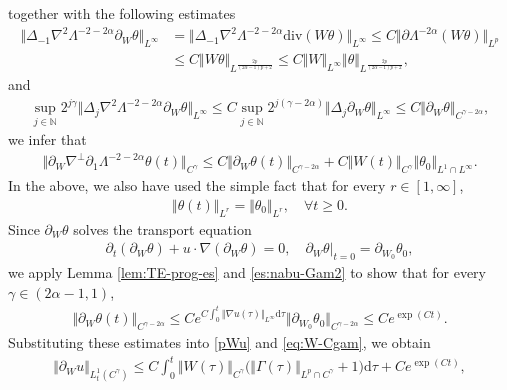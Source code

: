 \documentclass[reqno,11pt,a4paper]{amsart}
\newcommand{\NN}{\ensuremath{\mathbb{N}}}
\newcommand{\dd}{\mathrm{d}}
\def \p {\partial}
\begin{document}
together with the following estimates
\begin{align*}
  \Vert \Delta_{-1} \nabla^2 \Lambda^{-2-2\alpha} \p_W\theta\Vert _{L^\infty}
  & =\Vert \Delta_{-1} \nabla^2 \Lambda^{-2-2\alpha} \mathrm{div}(W\theta)\Vert _{L^\infty}
  \leq C\Vert \p \Lambda^{-2\alpha} (W\theta)\Vert _{L^p}\\
  &\leq C\Vert W\theta\Vert _{L^\frac{2p}{(2\alpha-1)p+2}}\leq C\Vert W\Vert _{L^\infty}\Vert \theta\Vert _{L^\frac{2p}{(2\alpha-1)p+2}},
\end{align*}
and
\begin{align*}
  \sup\limits_{j\in\NN}2^{j\gamma}\Vert \Delta_j \nabla^2 
  \Lambda^{-2-2\alpha} \p_W\theta\Vert _{L^\infty}
  \leq C \sup\limits_{j\in\NN} 2^{j(\gamma-2\alpha)}\Vert \Delta_j \p_W\theta\Vert _{L^\infty}
  \leq C \Vert  \p_W\theta\Vert _{C^{\gamma-2\alpha}},
\end{align*}
we infer that 
\begin{align*}
  \big\Vert \partial_W \nabla^{\perp}\p_1\Lambda^{-2-2\alpha} \theta(t) \big\Vert _{C^\gamma}  
  \leq  C \Vert  \p_W\theta(t)\Vert _{C^{\gamma-2\alpha}} 
  + C \Vert  W(t)\Vert _{C^\gamma} \Vert \theta_0\Vert _{L^1\cap L^\infty}.
\end{align*}
In the above, we also have used the simple fact that for every $r\in[1,\infty]$,\,
\begin{align}\label{eq:the-MP} 
  \Vert \theta(t)\Vert _{L^r}=\Vert \theta_0\Vert _{L^r},\quad \forall t\geq 0.
\end{align}
Since $\partial_W\theta$ solves the transport equation
\begin{align}\label{eq:par-W-the}
  \partial_t (\partial_W \theta) + u\cdot \nabla(\partial_W \theta) =0,\quad 
  \partial_W \theta |_{t=0} = \partial_{W_0} \theta_0,
\end{align}
we apply Lemma \ref{lem:TE-prog-es} and \eqref{es:nabu-Gam2} to show that for every $\gamma\in(2\alpha-1,1)$,
\begin{align}\label{eq:parWthe-Bes2}
  \Vert \partial_W \theta(t)\Vert _{C^{\gamma-2\alpha}} \leq C  e^{C \int_0^t \Vert \nabla u(\tau)\Vert _{L^\infty}
  \dd \tau} \Vert \partial_{W_0}\theta_0\Vert _{C^{\gamma-2\alpha}} \leq C  e^{\exp(C t)}.
\end{align}
Substituting these estimates into \eqref{pWu} and \eqref{eq:W-Cgam}, we obtain
\begin{align*}
  \Vert \partial_W  u\Vert _{L^1_t(C^\gamma)} 
  \leq C \int_0^t \Vert W(\tau)\Vert _{C^\gamma} \big(\Vert \Gamma(\tau)\Vert _{L^p \cap C^\gamma} 
  + 1  \big) \dd \tau 
  + C e^{\exp (Ct)},
\end{align*}
\end{document}
